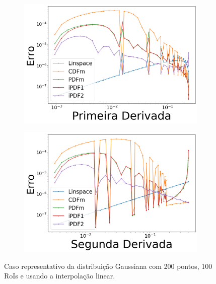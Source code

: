 \begin{figure}[H]
	\begin{subfigure}[b]{0.45\textwidth}
		\centering 
		\includegraphics[width=\textwidth]{./figuras/error_normal_linear_Primeira_Derivada_1.png}
		\caption{}
		\label{fig:11c}
	\end{subfigure}
	\hfill
	\begin{subfigure}[b]{0.45\textwidth}
		\centering 
		\includegraphics[width=\textwidth]{./figuras/error_normal_linear_Segunda_Derivada_1.png}
		\caption{}
		\label{fig:11d}
	\end{subfigure}
	\caption{Caso representativo da distribuição Gaussiana com 200 pontos, 100 RoIs e usando a interpolação linear.}\label{fig:11}
\end{figure}

